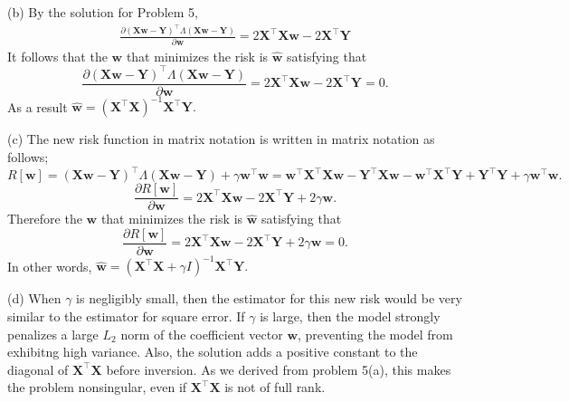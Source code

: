 \documentclass[11pt]{exam}
\theoremstyle{quest}
\begin{document}
(b) By the solution for Problem 5,
\begin{align*}
\frac{\partial (\textbf{Xw} - \textbf{Y})^\top \Lambda (\textbf{Xw} - \textbf{Y})}{\partial \textbf{w}} = 2\textbf{X}^\top \textbf{X} \textbf{w} -2\textbf{X}^\top \textbf{Y} 
 \end{align*}
 It follows that the $\textbf{w}$ that minimizes the risk is $\hat{\textbf{w}}$ satisfying that 
 \[
 \frac{\partial (\textbf{Xw} - \textbf{Y})^\top \Lambda (\textbf{Xw} - \textbf{Y})}{\partial \textbf{w}} = 2\textbf{X}^\top \textbf{X} \textbf{w} -2\textbf{X}^\top \textbf{Y}  = 0.
 \]
 As a result $\hat{\textbf{w}} = (\textbf{X}^\top \textbf{X})^{-1} \textbf{X}^\top \textbf{Y}.$ 


(c) The new risk function in matrix notation is written in matrix notation as follows;
\[
R[\textbf{w}] = (\textbf{Xw} - \textbf{Y})^\top \Lambda (\textbf{Xw} - \textbf{Y}) + \gamma \textbf{w}^\top \textbf{w} = \textbf{w}^\top \textbf{X}^\top \textbf{Xw} - \textbf{Y}^\top \textbf{Xw} -\textbf{w}^\top \textbf{X}^\top \textbf{Y} + \textbf{Y}^\top \textbf{Y} + \gamma \textbf{w}^\top \textbf{w}.
\]
\[
\frac{\partial R[\textbf{w}]}{\partial \textbf{w}} = 2\textbf{X}^\top \textbf{X} \textbf{w} -2\textbf{X}^\top \textbf{Y}  + 2 \gamma \textbf{w}.
\]
Therefore the $\textbf{w}$ that minimizes the risk is $\hat{\textbf{w}}$ satisfying that 
\[
\frac{\partial R[\textbf{w}]}{\partial \textbf{w}} = 2\textbf{X}^\top \textbf{X} \textbf{w} -2\textbf{X}^\top \textbf{Y}  + 2 \gamma \textbf{w}=0.
\]
In other words,  $\hat{\textbf{w}} = (\textbf{X}^\top \textbf{X} + \gamma I )^{-1} \textbf{X}^\top \textbf{Y}. $


(d) When $\gamma$ is negligibly small, then the estimator for this new risk would be very similar to the estimator for square error. If $\gamma$ is large, then the model strongly penalizes a large $L_2$ norm of the coefficient vector $\textbf{w}$, preventing the model from exhibitng high variance. Also, the solution adds a positive constant to the diagonal of $\textbf{X}^\top \textbf{X}$ before inversion. As we derived from problem 5(a), this makes the problem nonsingular, even if $\textbf{X}^\top \textbf{X}$ is not of full rank. 
\end{document}
